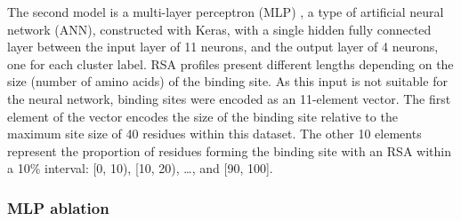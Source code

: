 The second model is a multi-layer perceptron (MLP) \cite{CYBENKO_1989_MLP}, a type of artificial neural network (ANN), constructed with Keras, \cite{CHOLLET_2015_KERAS} with a single hidden fully connected layer between the input layer of 11 neurons, and the output layer of 4 neurons, one for each cluster label. RSA profiles present different lengths depending on the size (number of amino acids) of the binding site. As this input is not suitable for the neural network, binding sites were encoded as an 11-element vector. The first element of the vector encodes the size of the binding site relative to the maximum site size of 40 residues within this dataset. The other 10 elements represent the proportion of residues forming the binding site with an RSA within a 10\% interval: [0, 10), [10, 20), …, and [90, 100].

\subsubsection{MLP ablation}


